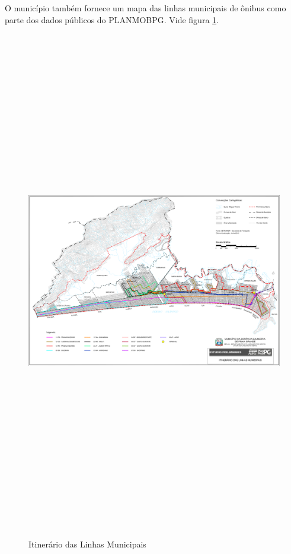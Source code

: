 	O município também fornece um mapa das linhas municipais de ônibus como parte dos dados públicos do PLANMOBPG. Vide figura \ref{mapa_onibusmuni}.
	
	\begin{landscape}
		\begin{figure}[p]
			\centering
			\caption{Itinerário das Linhas Municipais}
			\includegraphics[width=22cm,height=22cm,keepaspectratio]{img/Itinerario_das_Linhas_Municipais.png}
			\label{mapa_onibusmuni}
		\end{figure}
	\end{landscape}
	
